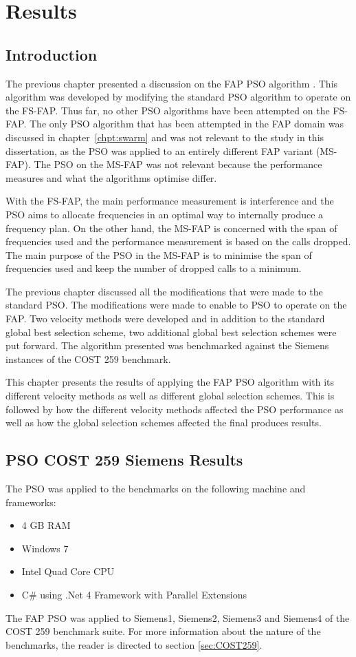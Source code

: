 \chapter{Results}
\label{chpt:results}
\section{Introduction}
The previous chapter presented a discussion on the FAP PSO algorithm . This algorithm was developed by modifying the standard PSO algorithm to operate on the FS-FAP. Thus far, no other PSO algorithms have been attempted on the FS-FAP. The only PSO algorithm that has been attempted in the FAP domain was discussed in chapter~\ref{chpt:swarm} and was not relevant to the study in this dissertation, as the PSO was applied to an entirely different FAP variant (MS-FAP). The PSO on the MS-FAP was not relevant because the performance measures and what the algorithms optimise differ.

With the FS-FAP, the main performance measurement is interference and the PSO aims to allocate frequencies in an optimal way to internally produce a frequency plan. On the other hand, the MS-FAP is concerned with the span of frequencies used and the performance measurement is based on the calls dropped. The main purpose of the PSO in the MS-FAP is to minimise the span of frequencies used and keep the number of dropped calls to a minimum.

The previous chapter discussed all the modifications that were made to the standard PSO. The modifications were made to enable to PSO to operate on the FAP. Two velocity methods were developed and in addition to the standard global best selection scheme, two additional global best selection schemes were put forward. The algorithm presented was benchmarked against the Siemens instances of the COST 259 benchmark.

This chapter presents the results of applying the FAP PSO algorithm with its different velocity methods as well as different global selection schemes. This is followed by how the different velocity methods affected the PSO performance as well as how the global selection schemes affected the final produces results.

\section{PSO COST 259 Siemens Results}
The PSO was applied to the benchmarks on the following machine and frameworks:
\begin{itemize}
\item 4 GB RAM
\item Windows 7
\item Intel Quad Core CPU
\item C\# using .Net 4 Framework with Parallel Extensions
\end{itemize}
The FAP PSO was applied to Siemens1, Siemens2, Siemens3 and Siemens4 of the COST 259 benchmark suite. For more information about the nature of the benchmarks, the reader is directed to section \ref{sec:COST259}.

